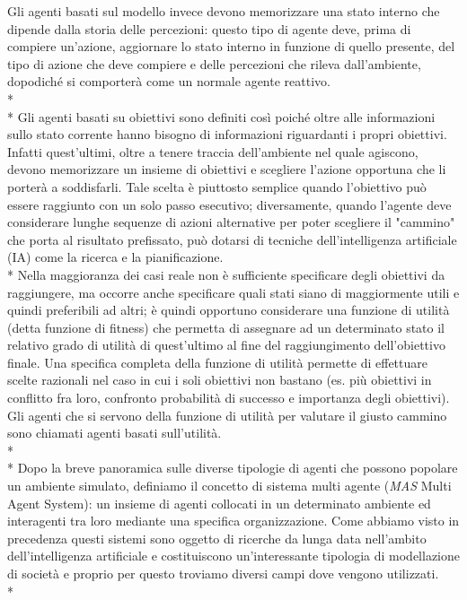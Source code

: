 \documentclass[12pt,a4paper,openright,twoside]{report}
\begin{document}
Gli agenti basati sul modello invece devono memorizzare una stato interno che dipende dalla storia delle percezioni: questo tipo di agente deve, prima di compiere un'azione, aggiornare lo stato interno in funzione di quello presente, del tipo di azione che deve compiere e delle percezioni che rileva dall'ambiente, dopodiché si comporterà come un normale agente reattivo.\\* \\*
Gli agenti basati su obiettivi sono definiti così poiché oltre alle informazioni sullo stato corrente hanno bisogno di informazioni riguardanti i propri obiettivi. Infatti quest'ultimi, oltre a tenere traccia dell'ambiente nel quale agiscono, devono memorizzare un insieme di obiettivi  e scegliere   l'azione opportuna che li porterà a soddisfarli. Tale scelta è piuttosto semplice quando l'obiettivo può essere raggiunto con un solo passo esecutivo; diversamente, quando l'agente deve considerare lunghe sequenze di azioni alternative per poter scegliere il "cammino" che porta al risultato prefissato, può dotarsi di tecniche dell'intelligenza artificiale  (IA) come la ricerca e la pianificazione.
\\*
Nella maggioranza dei casi reale non è sufficiente specificare degli obiettivi da raggiungere, ma occorre anche specificare quali stati siano di maggiormente utili e quindi preferibili ad altri; è quindi opportuno considerare una funzione di utilità (detta funzione di fitness) che permetta di assegnare ad un determinato stato il relativo grado di utilità di quest'ultimo al fine del raggiungimento dell'obiettivo finale. Una specifica completa della funzione di utilità permette di effettuare scelte razionali nel caso in cui i soli obiettivi non bastano (es. più obiettivi in conflitto fra loro, confronto probabilità di successo e importanza degli obiettivi). Gli agenti che si servono della funzione di utilità per valutare il giusto cammino sono chiamati agenti basati sull'utilità.
\\* \\*
Dopo la breve panoramica sulle diverse tipologie di agenti che possono popolare un ambiente simulato, definiamo il concetto di sistema multi agente (\emph{MAS} Multi Agent System): un insieme di agenti collocati in un determinato ambiente ed interagenti tra loro mediante una specifica organizzazione. Come abbiamo visto in precedenza questi sistemi sono oggetto di ricerche da lunga data nell'ambito dell'intelligenza artificiale e costituiscono un'interessante tipologia di modellazione di società e proprio per questo troviamo diversi campi dove vengono utilizzati.\\*
\end{document}
